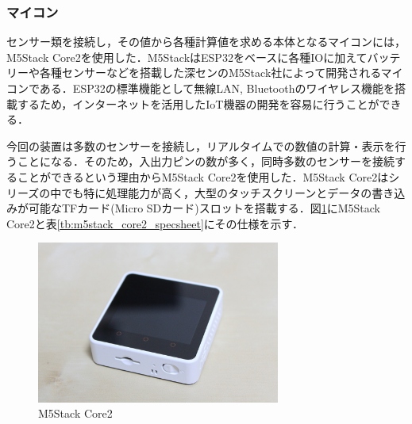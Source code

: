 \subsubsection{マイコン}

センサー類を接続し，その値から各種計算値を求める本体となるマイコンには，M5Stack Core2を使用した．M5StackはESP32をベースに各種IOに加えてバッテリーや各種センサーなどを搭載した深センのM5Stack社によって開発されるマイコンである．ESP32の標準機能として無線LAN, Bluetoothのワイヤレス機能を搭載するため，インターネットを活用したIoT機器の開発を容易に行うことができる．

今回の装置は多数のセンサーを接続し，リアルタイムでの数値の計算・表示を行うことになる．そのため，入出力ピンの数が多く，同時多数のセンサーを接続することができるという理由からM5Stack Core2を使用した．M5Stack Core2はシリーズの中でも特に処理能力が高く，大型のタッチスクリーンとデータの書き込みが可能なTFカード(Micro SDカード)スロットを搭載する．図\ref{fig:m5stack_core2}にM5Stack Core2と表\ref{tb:m5stack_core2_specsheet}にその仕様を示す．

\begin{figure}[H]
  \begin{center}
    \includegraphics[width=8cm]{fig/m5stack_core2}
    \caption{M5Stack Core2}
    \label{fig:m5stack_core2}
  \end{center}
\end{figure}

